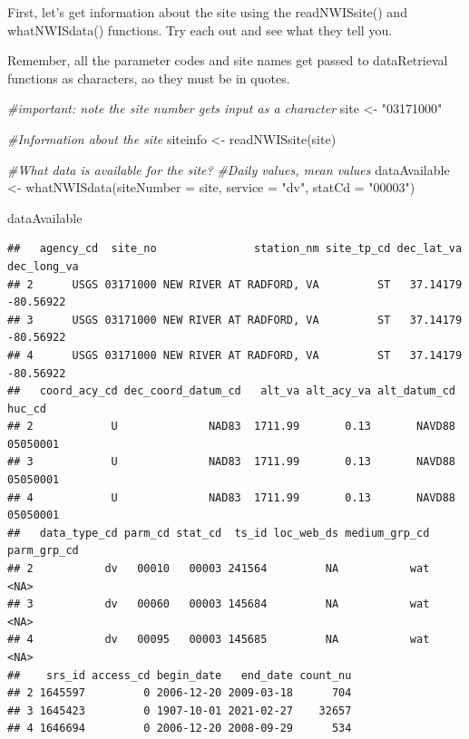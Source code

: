 \documentclass[
]{book}
\newenvironment{Shaded}{\begin{snugshade}}{\end{snugshade}}
\newcommand{\AttributeTok}[1]{\textcolor[rgb]{0.77,0.63,0.00}{#1}}
\newcommand{\CommentTok}[1]{\textcolor[rgb]{0.56,0.35,0.01}{\textit{#1}}}
\newcommand{\FunctionTok}[1]{\textcolor[rgb]{0.00,0.00,0.00}{#1}}
\newcommand{\NormalTok}[1]{#1}
\newcommand{\OtherTok}[1]{\textcolor[rgb]{0.56,0.35,0.01}{#1}}
\newcommand{\StringTok}[1]{\textcolor[rgb]{0.31,0.60,0.02}{#1}}
\begin{document}
First, let's get information about the site using the readNWISsite() and whatNWISdata() functions. Try each out and see what they tell you.

Remember, all the parameter codes and site names get passed to dataRetrieval functions as characters, ao they must be in quotes.

\begin{Shaded}
\begin{Highlighting}[]
\CommentTok{\#important: note the site number gets input as a character}
\NormalTok{site }\OtherTok{\textless{}{-}} \StringTok{"03171000"}

\CommentTok{\#Information about the site}
\NormalTok{siteinfo }\OtherTok{\textless{}{-}} \FunctionTok{readNWISsite}\NormalTok{(site)}

\CommentTok{\#What data is available for the site?}
\CommentTok{\#Daily values, mean values}
\NormalTok{dataAvailable }\OtherTok{\textless{}{-}} \FunctionTok{whatNWISdata}\NormalTok{(}\AttributeTok{siteNumber =}\NormalTok{ site, }\AttributeTok{service =} \StringTok{"dv"}\NormalTok{, }\AttributeTok{statCd =} \StringTok{"00003"}\NormalTok{)}

\NormalTok{dataAvailable}
\end{Highlighting}
\end{Shaded}

\begin{verbatim}
##   agency_cd  site_no               station_nm site_tp_cd dec_lat_va dec_long_va
## 2      USGS 03171000 NEW RIVER AT RADFORD, VA         ST   37.14179   -80.56922
## 3      USGS 03171000 NEW RIVER AT RADFORD, VA         ST   37.14179   -80.56922
## 4      USGS 03171000 NEW RIVER AT RADFORD, VA         ST   37.14179   -80.56922
##   coord_acy_cd dec_coord_datum_cd   alt_va alt_acy_va alt_datum_cd   huc_cd
## 2            U              NAD83  1711.99       0.13       NAVD88 05050001
## 3            U              NAD83  1711.99       0.13       NAVD88 05050001
## 4            U              NAD83  1711.99       0.13       NAVD88 05050001
##   data_type_cd parm_cd stat_cd  ts_id loc_web_ds medium_grp_cd parm_grp_cd
## 2           dv   00010   00003 241564         NA           wat        <NA>
## 3           dv   00060   00003 145684         NA           wat        <NA>
## 4           dv   00095   00003 145685         NA           wat        <NA>
##    srs_id access_cd begin_date   end_date count_nu
## 2 1645597         0 2006-12-20 2009-03-18      704
## 3 1645423         0 1907-10-01 2021-02-27    32657
## 4 1646694         0 2006-12-20 2008-09-29      534
\end{verbatim}
\end{document}
